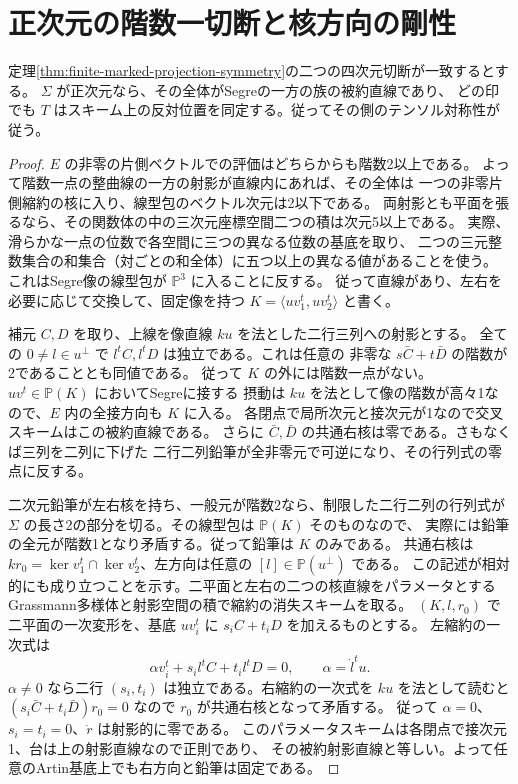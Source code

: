 \section{正次元の階数一切断と核方向の剛性}
\label{sec:finite-marked-ruling-pencil}
\begin{theorem}\label{thm:finite-marked-ruling-pencil}
定理\ref{thm:finite-marked-projection-symmetry}の二つの四次元切断が一致するとする。
$\Sigma$ が正次元なら、その全体がSegreの一方の族の被約直線であり、
どの印でも $T$ はスキーム上の反対位置を同定する。従ってその側のテンソル対称性が従う。
\end{theorem}
\begin{proof}
$E$ の非零の片側ベクトルでの評価はどちらからも階数2以上である。
よって階数一点の整曲線の一方の射影が直線内にあれば、その全体は
一つの非零片側縮約の核に入り、線型包のベクトル次元は2以下である。
両射影とも平面を張るなら、その関数体の中の三次元座標空間二つの積は次元5以上である。
実際、滑らかな一点の位数で各空間に三つの異なる位数の基底を取り、
二つの三元整数集合の和集合（対ごとの和全体）に五つ以上の異なる値があることを使う。
これはSegre像の線型包が $\mathbb P^3$ に入ることに反する。
従って直線があり、左右を必要に応じて交換して、固定像を持つ
$K=\langle u v_1^t,u v_2^t\rangle$ と書く。

補元 $C,D$ を取り、上線を像直線 $ku$ を法とした二行三列への射影とする。
全ての $0\ne l\in u^\perp$ で $l^t C,l^t D$ は独立である。これは任意の
非零な $s\bar C+t\bar D$ の階数が2であることとも同値である。
従って $K$ の外には階数一点がない。$uv^t\in\mathbb P(K)$ においてSegreに接する
摂動は $ku$ を法として像の階数が高々1なので、$E$ 内の全接方向も $K$ に入る。
各閉点で局所次元と接次元が1なので交叉スキームはこの被約直線である。
さらに $\bar C,\bar D$ の共通右核は零である。さもなくば三列を二列に下げた
二行二列鉛筆が全非零元で可逆になり、その行列式の零点に反する。

二次元鉛筆が左右核を持ち、一般元が階数2なら、制限した二行二列の行列式が
$\Sigma$ の長さ2の部分を切る。その線型包は $\mathbb P(K)$ そのものなので、
実際には鉛筆の全元が階数1となり矛盾する。従って鉛筆は $K$ のみである。
共通右核は $kr_0=\ker v_1^t\cap\ker v_2^t$、左方向は任意の $[l]\in\mathbb P(u^\perp)$ である。
この記述が相対的にも成り立つことを示す。二平面と左右の二つの核直線をパラメータとする
Grassmann多様体と射影空間の積で縮約の消失スキームを取る。
$(K,l,r_0)$ で二平面の一次変形を、基底 $uv_i^t$ に $s_i C+t_i D$ を加えるものとする。
左縮約の一次式は
\[
 \alpha v_i^t+s_i l^t C+t_i l^t D=0,\qquad \alpha=\dot l^t u .
\]
$\alpha\ne0$ なら二行 $(s_i,t_i)$ は独立である。右縮約の一次式を $ku$ を法として読むと
$(s_i\bar C+t_i\bar D)r_0=0$ なので $r_0$ が共通右核となって矛盾する。
従って $\alpha=0$、$s_i=t_i=0$、$\dot r$ は射影的に零である。
このパラメータスキームは各閉点で接次元1、台は上の射影直線なので正則であり、
その被約射影直線と等しい。よって任意のArtin基底上でも右方向と鉛筆は固定である。


\end{proof}
